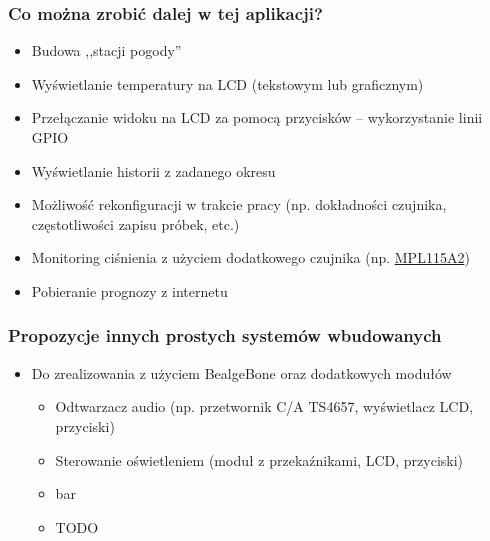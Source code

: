 \documentclass[dvipsnames,table]{beamer}
\begin{document}

\begin{frame}
\frametitle{Co można zrobić dalej w tej aplikacji?}
\begin{itemize}
	\item Budowa ,,stacji pogody''
	\item Wyświetlanie temperatury na LCD (tekstowym lub graficznym)
	\item Przełączanie widoku na LCD za pomocą przycisków -- wykorzystanie linii GPIO
	\item Wyświetlanie historii z zadanego okresu
	\item Możliwość rekonfiguracji w trakcie pracy (np. dokładności czujnika, częstotliwości zapisu próbek, etc.)
	\item Monitoring ciśnienia z użyciem dodatkowego czujnika (np. \href{http://www.freescale.com/files/sensors/doc/data_sheet/MPL115A2.pdf}{MPL115A2})
	\item Pobieranie prognozy z internetu
\end{itemize}
\end{frame}

\begin{frame}
\frametitle{Propozycje innych prostych systemów wbudowanych}
\begin{itemize}
	\item Do zrealizowania z użyciem BealgeBone oraz dodatkowych modułów
	\begin{itemize}
		\item Odtwarzacz audio (np. przetwornik C/A TS4657, wyświetlacz LCD, przyciski)
		\item Sterowanie oświetleniem (moduł z przekaźnikami, LCD, przyciski)
		\item bar
		\item TODO
	\end{itemize}
\end{itemize}
\end{frame}
\end{document}
